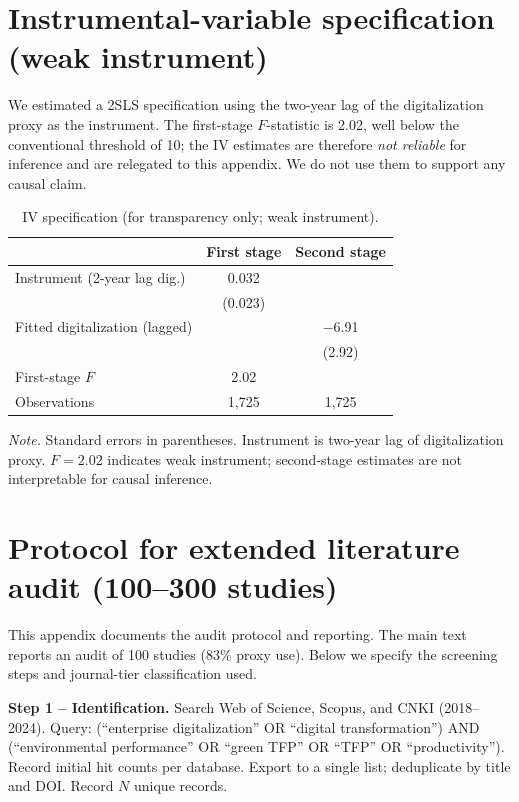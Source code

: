 \documentclass[3p,times,sort&compress]{elsarticle}
\begin{document}
\section{Instrumental-variable specification (weak instrument)}
\label{app:iv}

We estimated a 2SLS specification using the two-year lag of the digitalization proxy as the instrument. The first-stage $F$-statistic is 2.02, well below the conventional threshold of 10; the IV estimates are therefore \emph{not reliable} for inference and are relegated to this appendix. We do not use them to support any causal claim.

\begin{table}[t!]
  \centering
  \caption{IV specification (for transparency only; weak instrument).}
  \label{tab:app-iv}
  \small
  \begin{tabularx}{\textwidth}{@{}Xcc@{}}
    \toprule
    & First stage & Second stage \\
    \midrule
    Instrument (2-year lag dig.) & 0.032 & \\
    & (0.023) & \\
    Fitted digitalization (lagged) & & $-$6.91 \\
    & & (2.92) \\
    \midrule
    First-stage $F$ & 2.02 & \\
    Observations & 1,725 & 1,725 \\
    \bottomrule
  \end{tabularx}
  \medskip
  \parbox{\textwidth}{\raggedright\footnotesize\textit{Note.} Standard errors in parentheses. Instrument is two-year lag of digitalization proxy. $F = 2.02$ indicates weak instrument; second-stage estimates are not interpretable for causal inference.}
\end{table}

\section{Protocol for extended literature audit (100--300 studies)}
\label{app:audit-protocol}

This appendix documents the audit protocol and reporting. The main text reports an audit of 100 studies (83\% proxy use). Below we specify the screening steps and journal-tier classification used.

\textbf{Step 1 -- Identification.} Search Web of Science, Scopus, and CNKI (2018--2024). Query: (``enterprise digitalization'' OR ``digital transformation'') AND (``environmental performance'' OR ``green TFP'' OR ``TFP'' OR ``productivity''). Record initial hit counts per database. Export to a single list; deduplicate by title and DOI. Record $N$ unique records.
\end{document}
